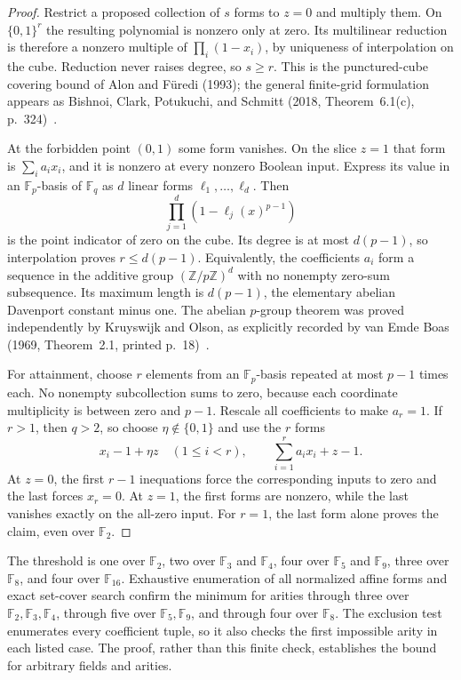 \begin{proof}
Restrict a proposed collection of $s$ forms to $z=0$ and multiply them. On $\{0,1\}^r$ the resulting polynomial is nonzero only at zero. Its multilinear reduction is therefore a nonzero multiple of $\prod_i(1-x_i)$, by uniqueness of interpolation on the cube. Reduction never raises degree, so $s\ge r$. This is the punctured-cube covering bound of Alon and F\"uredi (1993); the general finite-grid formulation appears as Bishnoi, Clark, Potukuchi, and Schmitt (2018, Theorem~6.1(c), p.~324)~\cite{st-af,st-bcps}.

At the forbidden point $(0,1)$ some form vanishes. On the slice $z=1$ that form is $\sum_i a_ix_i$, and it is nonzero at every nonzero Boolean input. Express its value in an $\mathbb F_p$-basis of $\mathbb F_q$ as $d$ linear forms $\ell_1,\ldots,\ell_d$. Then
\[
                       \prod_{j=1}^d(1-\ell_j(x)^{p-1})
\]
is the point indicator of zero on the cube. Its degree is at most $d(p-1)$, so interpolation proves $r\le d(p-1)$. Equivalently, the coefficients $a_i$ form a sequence in the additive group $(\mathbb Z/p\mathbb Z)^d$ with no nonempty zero-sum subsequence. Its maximum length is $d(p-1)$, the elementary abelian Davenport constant minus one. The abelian $p$-group theorem was proved independently by Kruyswijk and Olson, as explicitly recorded by van Emde Boas (1969, Theorem~2.1, printed p.~18)~\cite{st-veb,st-olson}.

For attainment, choose $r$ elements from an $\mathbb F_p$-basis repeated at most $p-1$ times each. No nonempty subcollection sums to zero, because each coordinate multiplicity is between zero and $p-1$. Rescale all coefficients to make $a_r=1$. If $r>1$, then $q>2$, so choose $\eta\notin\{0,1\}$ and use the $r$ forms
\[
 x_i-1+\eta z\quad(1\le i<r),\qquad
                     \sum_{i=1}^ra_ix_i+z-1.
\]
At $z=0$, the first $r-1$ inequations force the corresponding inputs to zero and the last forces $x_r=0$. At $z=1$, the first forms are nonzero, while the last vanishes exactly on the all-zero input. For $r=1$, the last form alone proves the claim, even over $\mathbb F_2$.
\end{proof}

The threshold is one over $\mathbb F_2$, two over $\mathbb F_3$ and $\mathbb F_4$, four over $\mathbb F_5$ and $\mathbb F_9$, three over $\mathbb F_8$, and four over $\mathbb F_{16}$. Exhaustive enumeration of all normalized affine forms and exact set-cover search confirm the minimum for arities through three over $\mathbb F_2,\mathbb F_3,\mathbb F_4$, through five over $\mathbb F_5,\mathbb F_9$, and through four over $\mathbb F_8$. The exclusion test enumerates every coefficient tuple, so it also checks the first impossible arity in each listed case. The proof, rather than this finite check, establishes the bound for arbitrary fields and arities.

